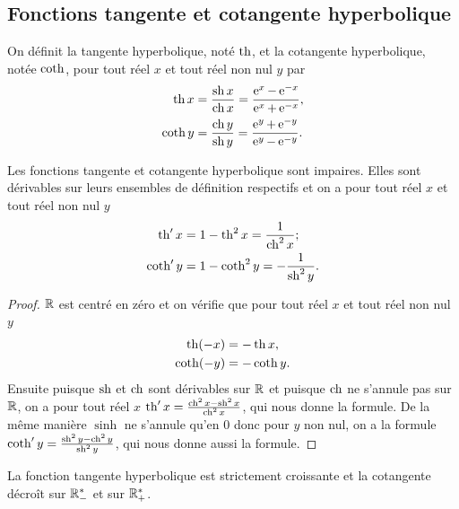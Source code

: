 \subsection{Fonctions tangente et cotangente
hyperbolique}\label{subsec:chap1-tanhetcotanh}

\begin{defdef}
  On définit la tangente hyperbolique, noté \(\operatorname{th}\), et la cotangente
  hyperbolique, notée \(\operatorname{coth}\), pour tout réel \(x\) et tout réel non nul
  \(y\) par
  \begin{align*}
    \operatorname{th}{x}& = \frac{\operatorname{sh}{x}}{\operatorname{ch}{x}} = \frac{\operatorname{e}^x-\operatorname{e}^{-x}}{\operatorname{e}^x+\operatorname{e}^{-x}},
    \\
    \operatorname{coth}{y}& = \frac{\operatorname{ch}{y}}{\operatorname{sh}{y}} = \frac{\operatorname{e}^y+\operatorname{e}^{-y}}{\operatorname{e}^y-\operatorname{e}^{-y}}.
  \end{align*}
\end{defdef}

\begin{prop}
  Les fonctions tangente et cotangente hyperbolique sont impaires. Elles sont
  dérivables sur leurs ensembles de définition respectifs et on a pour tout
  réel \(x\) et tout réel non nul \(y\)
  \begin{align*}
    \operatorname{th}' x &= 1-\operatorname{th}^2 x = \frac{1}{\operatorname{ch}^2 x}; \\
    \operatorname{coth}' y& = 1-\operatorname{coth}^2 y = -\frac{1}{\operatorname{sh}^2 y}.
  \end{align*}
\end{prop}

\begin{proof}
  \(\mathbb{R}\) est centré en zéro et on vérifie que pour tout réel \(x\) et tout réel
  non nul \(y\)
  \begin{align*}
    \operatorname{th}(-x)& = -\operatorname{th} x, \\
    \operatorname{coth}(-y)& = -\operatorname{coth} y.
  \end{align*}
  Ensuite puisque \(\operatorname{sh}\) et \(\operatorname{ch}\) sont dérivables sur \(\mathbb{R}\) et puisque
  \(\operatorname{ch}\) ne s'annule pas sur \(\mathbb{R}\), on a pour tout réel \(x\) \(\operatorname{th}' x =
  \frac{\operatorname{ch}^2 x - \operatorname{sh}^2 x}{\operatorname{ch}^2 x}\), qui nous donne la formule. De la
  même manière \(\sinh\) ne s'annule qu'en \(0\) donc pour \(y\) non nul, on a
  la formule \(\operatorname{coth}' y = \frac{\operatorname{sh}^2 y - \operatorname{ch}^2 y}{\operatorname{sh}^2 y}\),
  qui nous donne aussi la formule.
\end{proof}
La fonction tangente hyperbolique est strictement croissante et la cotangente
décroît sur \(\mathbb{R}_{-}^{*}\) et sur \(\mathbb{R}_{+}^{*}\).


